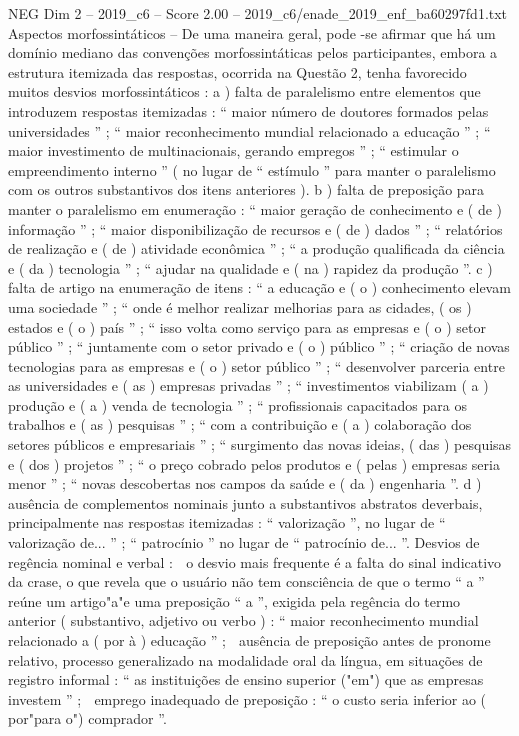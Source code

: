 \begin{textsample}{NEG Dim 2 – 2019\_c6 – Score 2.00 – 2019\_c6/enade\_2019\_enf\_ba60297fd1.txt}
Aspectos morfossintáticos – De uma maneira geral, pode -se afirmar que há um domínio mediano das convenções morfossintáticas pelos participantes, embora a estrutura itemizada das respostas, ocorrida na Questão 2, tenha favorecido muitos desvios morfossintáticos : a ) falta de paralelismo entre elementos que introduzem respostas itemizadas : “ maior número de doutores formados pelas universidades ” ; “ maior reconhecimento mundial relacionado a educação ” ; “ maior investimento de multinacionais, gerando empregos ” ; “ estimular o empreendimento interno ” ( no lugar de “ estímulo ” para manter o paralelismo com os outros substantivos dos itens anteriores ). b ) falta de preposição para manter o paralelismo em enumeração : “ maior geração de conhecimento e ( de ) informação ” ; “ maior disponibilização de recursos e ( de ) dados ” ; “ relatórios de realização e ( de ) atividade econômica ” ; “ a produção qualificada da ciência e ( da ) tecnologia ” ; “ ajudar na qualidade e ( na ) rapidez da produção ”. c ) falta de artigo na enumeração de itens : “ a educação e ( o ) conhecimento elevam uma sociedade ” ; “ onde é melhor realizar melhorias para as cidades, ( os ) estados e ( o ) país ” ; “ isso volta como serviço para as empresas e ( o ) setor público ” ; “ juntamente com o setor privado e ( o ) público ” ; “ criação de novas tecnologias para as empresas e ( o ) setor público ” ; “ desenvolver parceria entre as universidades e ( as ) empresas privadas ” ; “ investimentos viabilizam ( a ) produção e ( a ) venda de tecnologia ” ; “ profissionais capacitados para os trabalhos e ( as ) pesquisas ” ; “ com a contribuição e ( a ) colaboração dos setores públicos e empresariais ” ; “ surgimento das novas ideias, ( das ) pesquisas e ( dos ) projetos ” ; “ o preço cobrado pelos produtos e ( pelas ) empresas seria menor ” ; “ novas descobertas nos campos da saúde e ( da ) engenharia ”. d ) ausência de complementos nominais junto a substantivos abstratos deverbais, principalmente nas respostas itemizadas : “ valorização ”, no lugar de “ valorização de... ” ; “ patrocínio ” no lugar de “ patrocínio de... ”.
Desvios de regência nominal e verbal :  o desvio mais frequente é a falta do sinal indicativo da crase, o que revela que o usuário não tem consciência de que o termo “ a ” reúne um artigo"a"e uma preposição “ a ”, exigida pela regência do termo anterior ( substantivo, adjetivo ou verbo ) : “ maior reconhecimento mundial relacionado a ( por à ) educação ” ;  ausência de preposição antes de pronome relativo, processo generalizado na modalidade oral da língua, em situações de registro informal : “ as instituições de ensino superior ("em") que as empresas investem ” ;  emprego inadequado de preposição : “ o custo seria inferior ao ( por"para o") comprador ”.

\end{textsample}
